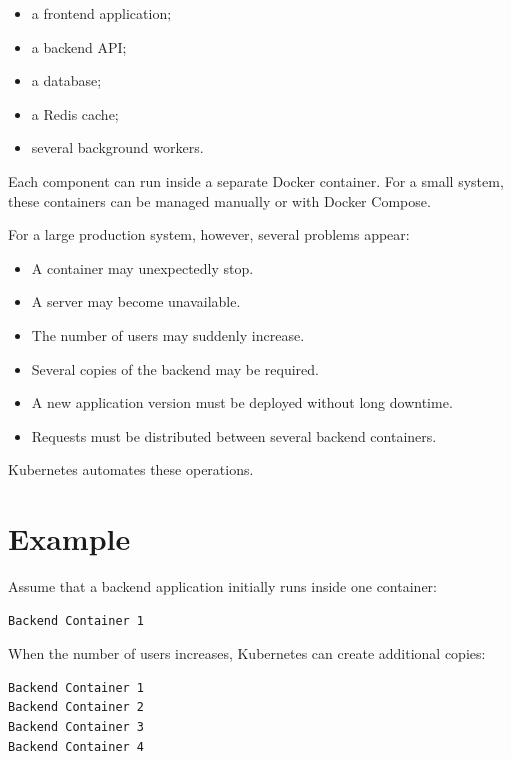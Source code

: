 \documentclass[a4paper]{article}
\begin{document}
        \begin{itemize}
            \item a frontend application;
            \item a backend API;
            \item a database;
            \item a Redis cache;
            \item several background workers.
        \end{itemize}
        
        Each component can run inside a separate Docker container. For a small system,
        these containers can be managed manually or with Docker Compose.
        
        For a large production system, however, several problems appear:
        
        \begin{itemize}
            \item A container may unexpectedly stop.
            \item A server may become unavailable.
            \item The number of users may suddenly increase.
            \item Several copies of the backend may be required.
            \item A new application version must be deployed without long downtime.
            \item Requests must be distributed between several backend containers.
        \end{itemize}
        
        Kubernetes automates these operations.
    
    
    \section{Example}
        
        Assume that a backend application initially runs inside one container:
        
        \begin{verbatim}
Backend Container 1
        \end{verbatim}
        
        When the number of users increases, Kubernetes can create additional copies:
        
        \begin{verbatim}
Backend Container 1
Backend Container 2
Backend Container 3
Backend Container 4
        \end{verbatim}
        
\end{document}
